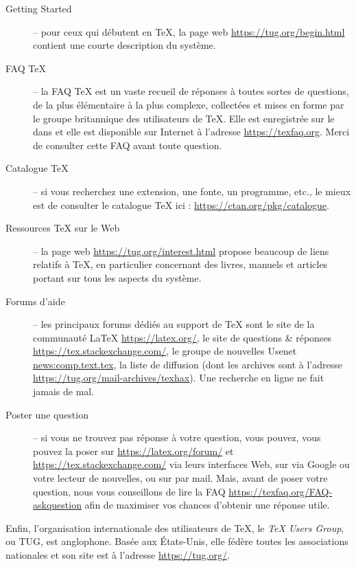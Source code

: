 \documentclass[german, english, french]{article}
\newcommand\eng[1]{\foreignlanguage{english}{\emph{#1}}}
\begin{document}
\begin{description}
\item[Getting Started] -- pour ceux qui débutent en \TeX, la page web
  \url{https://tug.org/begin.html} contient une courte description du système.

\item[FAQ \TeX{}] -- la FAQ \TeX{} est un vaste recueil de réponses à toutes
  sortes de questions, de la plus élémentaire à la plus complexe, collectées et
  mises en forme par le groupe britannique des utilisateurs de \TeX{}. Elle est
  enregistrée sur le \DVD{} dans  et elle
  est disponible sur Internet à l'adresse \url{https://texfaq.org}.  Merci de
  consulter cette FAQ avant toute question.

\item[Catalogue \TeX{}] -- si vous recherchez une extension, une fonte, un
  programme, etc., le mieux est de consulter le catalogue \TeX{} %
  ici : \url{https://ctan.org/pkg/catalogue}.

\item[Ressources \TeX{} sur le Web] -- la page web
  \url{https://tug.org/interest.html} propose beaucoup de liens relatifs
  à \TeX{}, en particulier concernant des livres, manuels et articles portant
  sur tous les aspects du système.

\item[Forums d'aide] -- les principaux forums dédiés au support de \TeX{} sont
  le site de la communauté \LaTeX{} \url{https://latex.org/}, le site de
  questions \& réponses \url{https://tex.stackexchange.com/}, le groupe de
  nouvelles Usenet \url{news:comp.text.tex}, la liste de diffusion
   (dont les archives sont à l'adresse
  \url{https://tug.org/mail-archives/texhax}).  Une recherche en ligne ne fait
  jamais de mal.

\item[Poster une question] -- si vous ne trouvez pas réponse à votre question,
  vous pouvez, vous pouvez la poser sur \url{https://latex.org/forum/} et
  \url{https://tex.stackexchange.com/} via leurs interfaces Web, sur
   via Google ou votre lecteur de nouvelles, ou sur
   par mail. Mais, avant de poser votre question, nous
  vous conseillons de lire la FAQ \url{https://texfaq.org/FAQ-askquestion} afin
  de maximiser vos chances d'obtenir une réponse utile.
\end{description}

Enfin, l'organisation internationale des utilisateurs de \TeX, le \eng{\TeX{}
  Users Group}, ou TUG, est anglophone. Basée aux États-Unis, elle fédère toutes
les associations nationales et son site est à l'adresse \url{https://tug.org/}.
\end{document}
